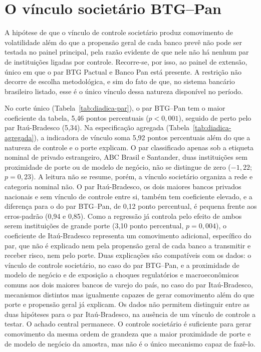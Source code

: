 \section{O vínculo societário BTG--Pan}
\label{sec:btg-pan}

A hipótese de que o vínculo de controle societário produz comovimento de
volatilidade além do que a propensão geral de cada banco prevê não pode ser
testada no painel principal, pela razão evidente de que nele não há nenhum par de
instituições ligadas por controle. Recorre-se, por isso, ao painel de extensão,
único em que o par BTG Pactual e Banco Pan está presente. A restrição não decorre
de escolha metodológica, e sim do fato de que, no sistema bancário brasileiro
listado, esse é o único vínculo dessa natureza disponível no período.

No corte único (Tabela~\ref{tab:diadica-par}), o par BTG--Pan tem o maior
coeficiente da tabela, 5,46 pontos percentuais ($p<0{,}001$), seguido de perto
pelo par Itaú-Bradesco (5,34). Na especificação agregada
(Tabela~\ref{tab:diadica-agregada}), a indicadora de vínculo soma 5,92 pontos
percentuais além do que a natureza de controle e o porte explicam. O par
classificado apenas sob a etiqueta nominal de privado estrangeiro, ABC Brasil e
Santander, duas instituições sem proximidade de porte ou de modelo de negócio, não
se distingue de zero ($-1{,}22$; $p=0{,}23$). A leitura não se resume, porém, a
vínculo societário organiza a rede e categoria nominal não. O par Itaú-Bradesco,
os dois maiores bancos privados nacionais e sem vínculo de controle entre si,
também tem coeficiente elevado, e a diferença para o do par BTG--Pan, de 0,12
ponto percentual, é pequena frente aos erros-padrão (0,94 e 0,85). Como a regressão
já controla pelo efeito de ambos serem instituições de grande porte (3,10 ponto
percentual, $p=0{,}004$), o coeficiente de Itaú-Bradesco representa um comovimento
adicional, específico do par, que não é explicado nem pela propensão geral de cada
banco a transmitir e receber risco, nem pelo porte. Duas explicações são
compatíveis com os dados: o vínculo de controle societário, no caso do par
BTG--Pan, e a proximidade de modelo de negócio e de exposição a choques
regulatórios e macroeconômicos comuns aos dois maiores bancos de varejo do país,
no caso do par Itaú-Bradesco, mecanismos distintos mas igualmente capazes de gerar
comovimento além do que porte e propensão geral já explicam. Os dados não permitem
distinguir entre as duas hipóteses para o par Itaú-Bradesco, na ausência de um
vínculo de controle a testar. O achado central permanece. O controle societário é
suficiente para gerar comovimento da mesma ordem de grandeza que a maior
proximidade de porte e de modelo de negócio da amostra, mas não é o único
mecanismo capaz de fazê-lo.

